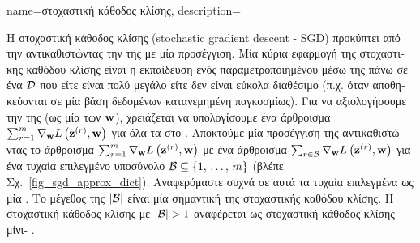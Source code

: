 {name={\foreignlanguage{greek}{στοχαστική κάθοδος κλίσης}}, 
	description={\foreignlanguage{greek}{Η στοχαστική κάθοδος κλίσης} 
		(stochastic gradient descent - SGD) \foreignlanguage{greek}{προκύπτει από την}  
		\foreignlanguage{greek}{αντικαθιστώντας την}  \foreignlanguage{greek}{της}  
		\foreignlanguage{greek}{με μία}  \foreignlanguage{greek}{προσέγγιση. Μία κύρια εφαρμογή της
		στοχαστικής καθόδου κλίσης είναι η εκπαίδευση ενός παραμετροποιημένου}  \foreignlanguage{greek}{μέσω
		της}  \foreignlanguage{greek}{πάνω σε ένα}  $\mathcal{D}$ \foreignlanguage{greek}{που  
		είτε είναι πολύ μεγάλο είτε δεν είναι εύκολα διαθέσιμο (π.χ. όταν}  \foreignlanguage{greek}{αποθηκεύονται 
		σε μία βάση δεδομένων κατανεμημένη παγκοσμίως). Για να αξιολογήσουμε την}  
		\foreignlanguage{greek}{της}  (\foreignlanguage{greek}{ως μία}  \foreignlanguage{greek}{των} 
		 ${\bf w}$), \foreignlanguage{greek}{χρειάζεται να υπολογίσουμε ένα άρθροισμα
		$\sum_{r=1}^{m} \nabla_{{\bf w}} L\left({\bf z}^{(r)},{\bf w} \right)$ για όλα τα}  
		\foreignlanguage{greek}{στο} . \foreignlanguage{greek}{Αποκτούμε μία}  
		\foreignlanguage{greek}{προσέγγιση της}  \foreignlanguage{greek}{αντικαθιστώντας το άρθροισμα  
		$\sum_{r=1}^{m} \nabla_{{\bf w}} L\left({\bf z}^{(r)},{\bf w} \right)$ 
		με ένα άρθροισμα $\sum_{r \in \mathcal{B}} \nabla_{{\bf w}} L\left({\bf z}^{(r)},{\bf w} \right)$ 
		για ένα τυχαία επιλεγμένο υποσύνολο $\mathcal{B} \subseteq \{1, \,\ldots, \,m\}$ (βλέπε Σχ.}\ \ref{fig_sgd_approx_dict}). 
		\foreignlanguage{greek}{Αναφερόμαστε συχνά σε αυτά τα τυχαία επιλεγμένα}  \foreignlanguage{greek}{ως 
		μία} . \foreignlanguage{greek}{Το μέγεθος της}  $|\mathcal{B}|$ \foreignlanguage{greek}{είναι μία 
		σημαντική}  \foreignlanguage{greek}{της στοχαστικής καθόδου κλίσης. Η στοχαστική κάθοδος κλίσης  
		με $|\batch|> 1$ αναφέρεται ως στοχαστική κάθοδος κλίσης μίνι}- \cite{Bottou99}. 		
		\begin{figure}[H]

\end{figure}}}
